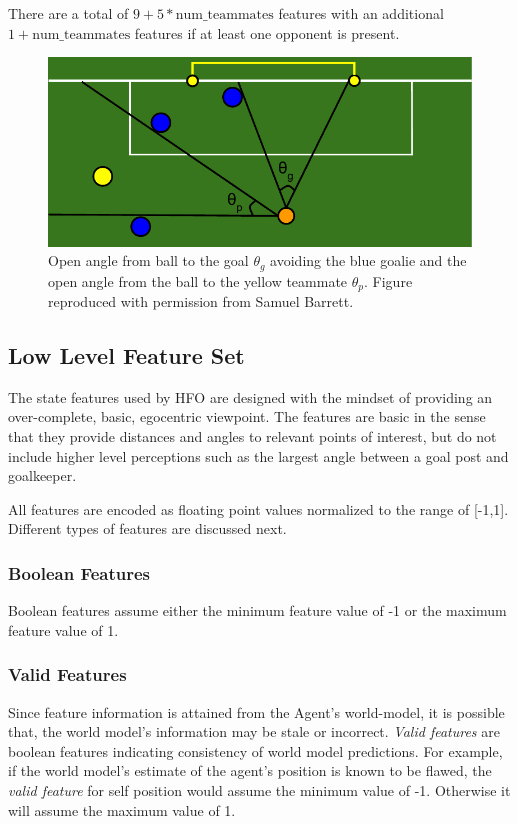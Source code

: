 \documentclass[12pt]{article}
\begin{document}
There are a total of $9 + 5*\textrm{num\_teammates}$ features with an
additional $1 + \textrm{num\_teammates}$ features if at least one
opponent is present.

\begin{figure}[htp]
  \centering
  \includegraphics[width=.75\textwidth]{figures/openAngle}
  \caption{Open angle from ball to the goal $\theta_g$ avoiding the
    blue goalie and the open angle from the ball to the yellow
    teammate $\theta_p$. Figure reproduced with permission from Samuel
    Barrett.}
  \label{fig:openAngle}
\end{figure}

\subsection {Low Level Feature Set}
The state features used by HFO are designed with the mindset of
providing an over-complete, basic, egocentric viewpoint. The features
are basic in the sense that they provide distances and angles to
relevant points of interest, but do not include higher level
perceptions such as the largest angle between a goal post and
goalkeeper.

All features are encoded as floating point values normalized to the
range of [-1,1]. Different types of features are discussed next.

\subsubsection{Boolean Features}

Boolean features assume either the minimum feature value of -1 or the
maximum feature value of 1.

\subsubsection{Valid Features}

Since feature information is attained from the Agent's world-model, it
is possible that, the world model's information may be stale or
incorrect. \textit{Valid features} are boolean features indicating
consistency of world model predictions. For example, if the world
model's estimate of the agent's position is known to be flawed, the
\textit{valid feature} for self position would assume the minimum
value of -1. Otherwise it will assume the maximum value of 1.
\end{document}
